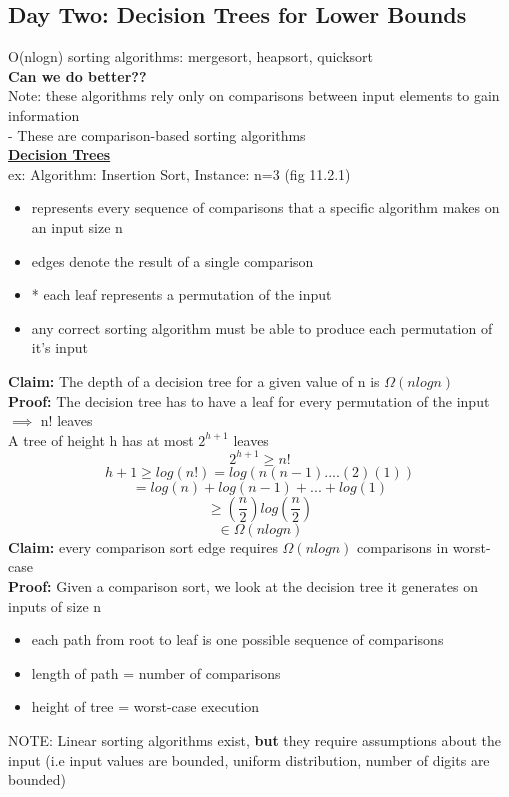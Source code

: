 \documentclass{article}
\begin{document}
	\subsection{Day Two: Decision Trees for Lower Bounds}
	O(nlogn) sorting algorithms: mergesort, heapsort, quicksort\\
	\textbf{Can we do better??\\}
	Note: these algorithms rely only on comparisons between input elements to gain information\\
	- These are comparison-based sorting algorithms\\
	\underline{\textbf{Decision Trees}}\\
	ex: Algorithm: Insertion Sort, Instance: n=3 (fig 11.2.1)
	\begin{itemize}
		\item represents every sequence of comparisons that a specific algorithm makes on an input size n
		\item edges denote the result of a single comparison
		\item * each leaf represents a permutation of the input
		\item any correct sorting algorithm must be able to produce each permutation of it's input
	\end{itemize}
	\textbf{Claim:} The depth of a decision tree for a given value of n is $\Omega(nlogn)$\\
	\textbf{Proof:} The decision tree has to have a leaf for every permutation of the input $\implies$ n! leaves\\
	A tree of height h has at most $2^{h+1}$ leaves $$2^{h+1}\ge n!$$ $$h+1\ge log(n!) = log(n(n-1)....(2)(1))$$ $$= log(n) + log(n-1) + ... + log(1)$$ $$\ge (\frac{n}{2})log(\frac{n}{2})$$ $$\in \Omega(nlogn)$$
	\textbf{Claim:} every comparison sort edge requires $\Omega(nlogn)$ comparisons in worst-case\\
	\textbf{Proof:} Given a comparison sort, we look at the decision tree it generates on inputs of size n
	\begin{itemize}
		\item each path from root to leaf is one possible sequence of comparisons
		\item length of path = number of comparisons 
		\item height of tree = worst-case execution\\
	\end{itemize}
	NOTE: Linear sorting algorithms exist, \textbf{but} they require assumptions about the input (i.e input values are bounded, uniform distribution, number of digits are bounded)\\\\
\end{document}

